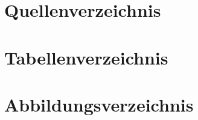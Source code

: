 \documentclass[oneside,11pt,parskip=half,ngerman]{scrreprt}
\begin{document}
\section{Quellenverzeichnis}\label{quellenverzeichnis}

\vspace*{-2.5cm}\renewcommand{\bibname}{}\begingroup \let\clearpage\relax
\printbibliography
\endgroup

\section{Tabellenverzeichnis}\label{tabellenverzeichnis}

\renewcommand{\listtablename}{} 

\begingroup \let\clearpage\relax
\listoftables
\endgroup

\section{Abbildungsverzeichnis}\label{abbildungsverzeichnis}

\renewcommand{\listfigurename}{} 

\begingroup\let\clearpage\relax
\listoffigures
\endgroup
\end{document}
